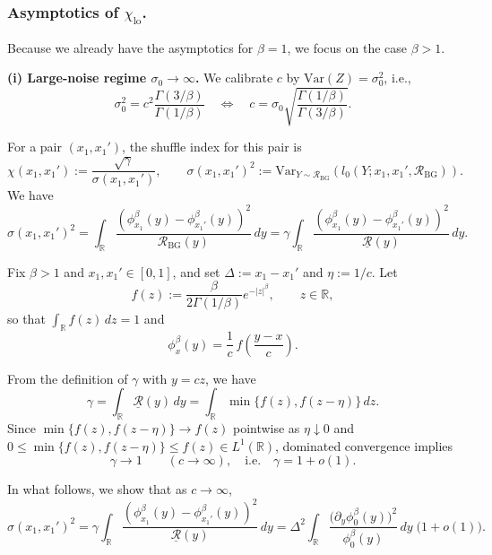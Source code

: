\documentclass{article}
\theoremstyle{plain}
\theoremstyle{definition}
\begin{document}
\subsubsection{Asymptotics of $\chi_{\mathrm{lo}}$.}
Because we already have the asymptotics for $\beta=1$, we focus on the case $\beta>1$.

\noindent\textbf{(i) Large-noise regime $\sigma_0\to \infty$.}
We calibrate $c$ by $\mathrm{Var}(Z)=\sigma_0^2$, i.e.,
\begin{equation}
\label{eq:c-sigma0}
\sigma_0^2=c^2\frac{\Gamma(3/\beta)}{\Gamma(1/\beta)}
\quad\Longleftrightarrow\quad
c=\sigma_0\sqrt{\frac{\Gamma(1/\beta)}{\Gamma(3/\beta)}}.
\end{equation}


For a pair $(x_1,x_1')$, the shuffle index for this pair is
\[
\chi(x_1,x_1')
:=\frac{\sqrt\gamma}{\sigma(x_1,x_1')},
\qquad
\sigma(x_1,x_1')^2
:=\mathrm{Var}_{Y\sim\mathcal R_{\mathrm{BG}}}\!\left(l_0(Y;x_1,x_1',\mathcal R_{\mathrm{BG}})\right).
\]
We have
\begin{equation}
\label{eq:sigma2}
\sigma(x_1,x_1')^2
=
\int_{\mathbb R}\frac{(\phi_{x_1}^\beta(y)-\phi_{x_1'}^\beta(y))^2}{\mathcal R_{\mathrm{BG}}(y)}\,dy
=
\gamma\int_{\mathbb R}\frac{(\phi_{x_1}^\beta(y)-\phi_{x_1'}^\beta(y))^2}{\underline{\mathcal R}(y)}\,dy.
\end{equation}


Fix $\beta>1$ and $x_1,x_1'\in[0,1]$, and set $\Delta:=x_1-x_1'$ and $\eta:=1/c$.
Let
\[
f(z):=\frac{\beta}{2\Gamma(1/\beta)}e^{-|z|^\beta},\qquad z\in\mathbb R,
\]
so that $\int_{\mathbb R}f(z)\,dz=1$ and
\[
\phi_x^\beta(y)=\frac1c\,f\!\left(\frac{y-x}{c}\right).
\]



From the definition of $\gamma$ with $y=cz$, we have
\begin{equation}\label{eq:gamma-eta}
\gamma=\int_{\mathbb R}\underline{\mathcal R}(y)\,dy
=\int_{\mathbb R}\min\{f(z),f(z-\eta)\}\,dz.
\end{equation}
Since $\min\{f(z),f(z-\eta)\}\to f(z)$ pointwise as $\eta\downarrow 0$ and
$0\le \min\{f(z),f(z-\eta)\}\le f(z)\in L^1(\mathbb R)$, dominated convergence implies
\begin{equation}\label{eq:gamma-to-1-eta}
\gamma\to 1 \qquad (c\to\infty),
\quad\text{i.e.}\quad \gamma=1+o(1).
\end{equation}




In what follows, we show that as $c\to\infty$,
\begin{equation}
\label{eq:sigma2-asymp}
\sigma(x_1,x_1')^2
=
\gamma\int_{\mathbb R}\frac{(\phi_{x_1}^\beta(y)-\phi_{x_1'}^\beta(y))^2}{\underline{\mathcal R}(y)}\,dy
=
\Delta^2
\int_{\mathbb R}
\frac{\bigl(\partial_y\phi_0^\beta(y)\bigr)^2}{\phi_0^\beta(y)}
\,dy\;
\bigl(1+o(1)\bigr).
\end{equation}
\end{document}
